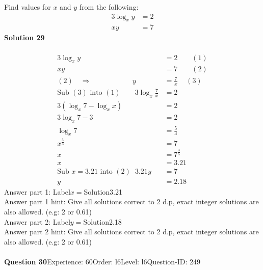 \documentclass{article}
\begin{document}
Find values for $x$ and $y$ from the following:
\begin{align*}
3\log_{x}y&=2\\[2pt]
xy&=7
\end{align*}
\noindent\textbf{Solution 29}\\[2pt]
\\[-35pt]\begin{align*}
3\log_{x}y&=2\qquad (1)\\[2pt]
xy&=7\qquad (2)\\[2pt]
(2) \quad\Rightarrow\hspace{69pt} y&=\displaystyle\frac{7}{x}\hspace{14pt} (3)\\[2pt]
\text{Sub}\,\,(3)\,\,\text{into}\,\,(1)\qquad 3\log_{x}\displaystyle\frac{7}{x}&=2\\[2pt]
3(\log_{x}7-\log_{x}x)&=2\\[2pt]
3\log_{x}7-3&=2\\[2pt]
\log_{x}7&=\displaystyle\frac{5}{3}\\[2pt]
x^{\frac{5}{3}}&=7\\[2pt]
x&=7^{\frac{3}{5}}\\[2pt]
x&=3.21\\[12pt]
\text{Sub}\,\,x=3.21\,\,\text{into}\,\,(2)\hspace{7pt} 3.21y&=7\\[2pt]
y&=2.18
\end{align*}
Answer part 1: \hspace{10pt}Label\hspace{10pt}$x=$\hspace{10pt}Solution\hspace{10pt}3.21\\
Answer part 1 hint: \hspace{15pt}Give all solutions correct to 2 d.p, exact integer solutions are also allowed. (e.g: 2 or 0.61)\\
Answer part 2: \hspace{10pt}Label\hspace{10pt}$y=$\hspace{10pt}Solution\hspace{10pt}2.18\\
Answer part 2 hint: \hspace{15pt}Give all solutions correct to 2 d.p, exact integer solutions are also allowed. (e.g: 2 or 0.61)\\
\\[4pt]
\noindent\textbf{Question 30}\hspace{20pt}Experience: 60\hspace{20pt}Order: l6\hspace{20pt}Level: l6\hspace{20pt}Question-ID: 249\\[2pt]
\end{document}
